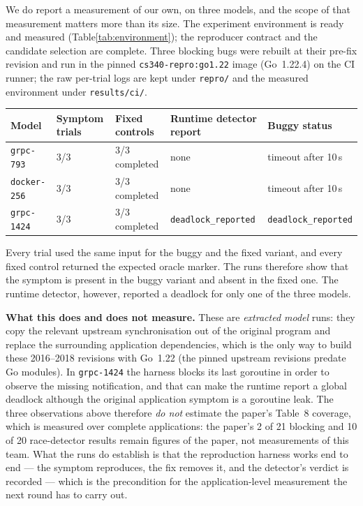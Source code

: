 \documentclass[11pt]{article}
\begin{document}
We do report a measurement of our own, on three models, and the scope of that
measurement matters more than its size. The experiment environment is ready and
measured (Table\ref{tab:environment}); the reproducer contract and the candidate
selection are complete. Three blocking bugs were rebuilt at their pre-fix revision
and run in the pinned \texttt{cs340-repro:go1.22} image (Go~1.22.4) on the CI
runner; the raw per-trial logs are kept under \texttt{repro/} and the measured
environment under \texttt{results/ci/}.

\begin{center}
\begin{tabular}{@{}lllll@{}}
\toprule
Model & Symptom trials & Fixed controls & Runtime detector report & Buggy status \\
\midrule
\texttt{grpc-793}   & 3/3 & 3/3 completed & none & timeout after 10\,s \\
\texttt{docker-256} & 3/3 & 3/3 completed & none & timeout after 10\,s \\
\texttt{grpc-1424}  & 3/3 & 3/3 completed & \texttt{deadlock\_reported} & \texttt{deadlock\_reported} \\
\bottomrule
\end{tabular}
\end{center}

Every trial used the same input for the buggy and the fixed variant, and every
fixed control returned the expected oracle marker. The runs therefore show that
the symptom is present in the buggy variant and absent in the fixed one. The
runtime detector, however, reported a deadlock for only one of the three models.

\textbf{What this does and does not measure.} These are \emph{extracted model}
runs: they copy the relevant upstream synchronisation out of the original program
and replace the surrounding application dependencies, which is the only way to
build these 2016--2018 revisions with Go~1.22 (the pinned upstream revisions
predate Go modules). In \texttt{grpc-1424} the harness blocks its last goroutine
in order to observe the missing notification, and that can make the runtime
report a global deadlock although the original application symptom is a
goroutine leak. The three observations above therefore \emph{do not} estimate
the paper's Table~8 coverage, which is measured over complete applications: the
paper's 2 of 21 blocking and 10 of 20 race-detector results remain figures of
the paper, not measurements of this team. What the runs do establish is that the
reproduction harness works end to end --- the symptom reproduces, the fix removes
it, and the detector's verdict is recorded --- which is the precondition for the
application-level measurement the next round has to carry out.
\end{document}
